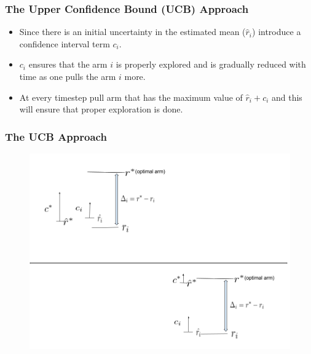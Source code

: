 

\begin{frame}
\frametitle{The Upper Confidence Bound (UCB) Approach}
\begin{itemize}
\item<1-> Since there is an initial uncertainty in the estimated mean ($\hat{r}_i$) introduce a confidence interval term $c_i$.
\item<2-> $c_i$ ensures that the arm $i$ is properly explored and is gradually reduced with time as one pulls the arm $i$ more.
\item<3-> At every timestep pull arm that has the maximum value of $\hat{r}_i + c_i$ and this will ensure that proper exploration is done. 
\end{itemize}
\end{frame}

\begin{frame}
\frametitle{The UCB Approach}
\begin{figure}
\includegraphics[scale=0.3]{img/UCB_Drawing.png}
\end{figure}
\end{frame}



